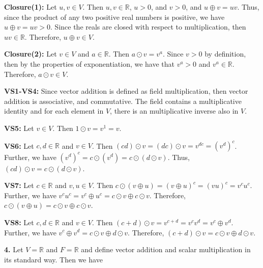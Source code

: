 \documentclass[12pt, a4paper]{article}
\begin{document}
\begin{description}

\item\textbf{Closure(1):} Let $u,v\in V$. Then $u,v\in\mathbb{R}$, $u>0$, and $v>0$, and $u\oplus v=uv$. Thus, since the product of any two positive real numbers is positive, we have $u\oplus v=uv>0$. Since the reals are closed with respect to multiplication, then $uv\in\mathbb{R}$. Therefore, $u\oplus v\in V$.

\item\textbf{Closure(2):} Let $v\in V$ and $ a\in\mathbb{R}$. Then $a\odot v= v^a$. Since $v>0$ by definition, then by the properties of exponentiation, we have that $v^a>0$ and $v^a\in\mathbb{R}$. Therefore, $a\odot v\in V$.

\item\textbf{VS1-VS4:} Since vector addition is defined as field multiplication, then vector addition is associative, and commutative. The field contains a multiplicative identity and for each element in $V$, there is an multiplicative inverse also in $V$.

\item\textbf{VS5:} Let $v\in V$. Then $1\odot v=v^1=v$. 

\item\textbf{VS6:} Let $c,d\in\mathbb{R}$ and $v\in V$. Then $(cd)\odot v=(dc)\odot v=v^{dc}=(v^d)^c$. Further, we have $(v^d)^c=c\odot(v^d)=c\odot(d\odot v)$. Thus, $(cd)\odot v=c\odot(d\odot v)$.

\item\textbf{VS7: }Let $c\in\mathbb{R}$ and $v,u\in V$. Then $c\odot(v\oplus u)=(v\oplus u)^c=(vu)^c=v^cu^c$. Further, we have $v^cu^c=v^c\oplus u^c=c\odot v\oplus c\odot v$. Therefore, $c\odot(v\oplus u)=c\odot v\oplus c\odot v$.

\item\textbf{VS8:} Let $c,d\in\mathbb{R}$ and $v\in V$. Then $(c+d)\odot v=v^{c+d}=v^cv^d=v^c\oplus v^d$. Further, we have $v^c\oplus v^d= c\odot v\oplus d\odot v$. Therefore, $(c+d)\odot v=c\odot v\oplus d\odot v$.

\end{description}

\newpage

\noindent\textbf{4.} Let $V=\mathbb{R}$ and $F=\mathbb{R}$ and define vector addition and scalar multiplication in its standard way. Then we have
\end{document}
